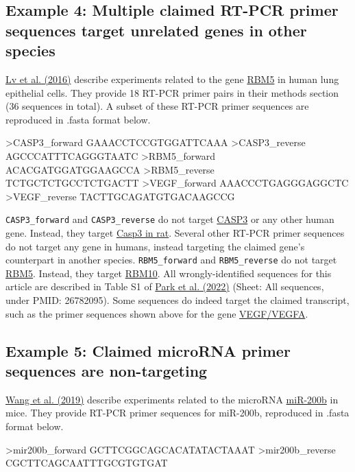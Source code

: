 \documentclass[letterpaper, 12pt]{article}
\begin{document}
\subsection*{Example 4: Multiple claimed RT-PCR primer sequences target unrelated genes in other species}

\href{https://doi.org/10.3892/or.2016.4551}{Lv et al. (2016)} describe experiments related to the gene \href{https://www.ncbi.nlm.nih.gov/gene/10181}{RBM5} in human lung epithelial cells. They provide 18 RT-PCR primer pairs in their methods section (36 sequences in total). A subset of these RT-PCR primer sequences are reproduced in .fasta format below.

\begin{verbatim*}
>CASP3_forward
GAAACCTCCGTGGATTCAAA
>CASP3_reverse
AGCCCATTTCAGGGTAATC
>RBM5_forward
ACACGATGGATGGAAGCCA
>RBM5_reverse
TCTGCTCTGCCTCTGACTT
>VEGF_forward
AAACCCTGAGGGAGGCTC
>VEGF_reverse
TACTTGCAGATGTGACAAGCCG
\end{verbatim*}

\verb|CASP3_forward| and \verb|CASP3_reverse| do not target \href{https://www.ncbi.nlm.nih.gov/gene/836}{CASP3} or any other human gene. Instead, they target \href{https://www.ncbi.nlm.nih.gov/gene/25402}{Casp3 in rat}. Several other RT-PCR primer sequences do not target any gene in humans, instead targeting the claimed gene's counterpart in another species. \verb|RBM5_forward| and \verb|RBM5_reverse| do not target \href{https://www.ncbi.nlm.nih.gov/gene/10181}{RBM5}. Instead, they target \href{https://www.ncbi.nlm.nih.gov/gene/8241}{RBM10}. All wrongly-identified sequences for this article are described in Table S1 of \href{https://doi.org/10.26508/lsa.202101203}{Park et al. (2022)} (Sheet: All sequences, under PMID: 26782095). Some sequences do indeed target the claimed transcript, such as the primer sequences shown above for the gene \href{https://www.ncbi.nlm.nih.gov/gene/7422}{VEGF/VEGFA}.

\subsection*{Example 5: Claimed microRNA primer sequences are non-targeting}

\href{https://doi.org/10.1002/jcb.28599}{Wang et al. (2019)} describe experiments related to the microRNA \href{https://www.ncbi.nlm.nih.gov/gene/387243}{miR-200b} in mice. They provide RT-PCR primer sequences for miR-200b, reproduced in .fasta format below.

\begin{verbatim*}
>mir200b_forward
GCTTCGGCAGCACATATACTAAAT
>mir200b_reverse
CGCTTCAGCAATTTGCGTGTGAT
\end{verbatim*}
\end{document}
